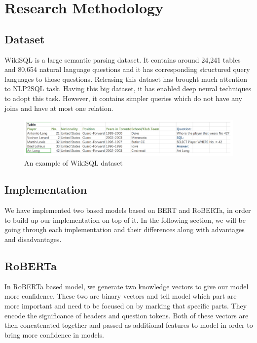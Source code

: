 \documentclass[12pt]{article}
\begin{document}
\section{Research Methodology}
\subsection{Dataset}
WikiSQL is a large semantic parsing dataset. It contains around 24,241 tables and 80,654 natural language questions and it has corresponding structured query languages to those questions. Releasing this dataset has brought much attention to NLP2SQL task. Having this big dataset, it has enabled deep neural techniques to adopt this task. However, it contains simpler queries which do not have any joins and have at most one relation. 
\begin{figure}[H]
    \includegraphics[width=450pt]{wikisql}
	\caption{An example of WikiSQL dataset}
    \label{fig:WikiSQL}
\end{figure}


\subsection{Implementation}
We have implemented two based models based on BERT and RoBERTa, in order to build up our implementation on top of it. In the following section, we will be going through each implementation and their differences along with advantages and disadvantages. 

\subsection{RoBERTa}
In RoBERTa based model, we generate two knowledge vectors to give our model more confidence. These two are binary vectors and tell model which part are more important and need to be focused on by marking that specific parts. They encode the significance of headers and question tokens. Both of these vectors are then concatenated together and passed as additional features to model in order to bring more confidence in models. 
\end{document}
